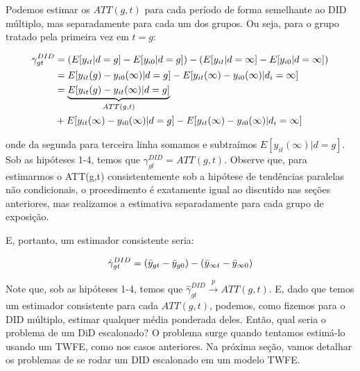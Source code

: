 \documentclass[portugues]{article}
\begin{document}
Podemos estimar os $ATT(g, t)$ para cada período de forma semelhante ao DID múltiplo, mas separadamente para cada um dos grupos. Ou seja, para o grupo tratado pela primeira vez em $t=g$:

\[
\begin{split}
    \gamma_{gt}^{DID} &= (E[y_{it} |d = g] -  E[y_{i0} |d = g]) - (E[y_{it} |d = \infty] -  E[y_{i0} |d = \infty]) \\
    &= E[y_{it}(g) - y_{i0}(\infty) | d=g]  - E[y_{it}(\infty) - y_{i0}(\infty) | d_i = \infty] \\
    &= \underbrace{E[y_{it}(g) - y_{it}(\infty) | d=g]}_{ATT(g,t)} \\
    & \hspace{5\infty} + E[y_{it}(\infty) - y_{i0}(\infty) | d=g] - E[y_{it}(\infty) - y_{i0}(\infty) | d_i = \infty] \\
\end{split}\]

\noindent onde da segunda para terceira linha somamos e subtraímos $E[y_{it}(\infty)|d=g]$. Sob as hipóteses 1-4, temos que $\gamma_{gt}^{DID} = ATT(g,t)$. Observe que, para estimarmos o ATT(g,t) consistentemente sob a hipótese de tendências paralelas não condicionais, o procedimento é exatamente igual ao discutido nas seções anteriores, mas realizamos a estimativa separadamente para cada grupo de exposição.

E, portanto, um estimador consistente seria:

$$ \hat{\gamma}^{DID}_{gt} = (\Bar{y}_{gt} - \Bar{y}_{g0}) - (\Bar{y}_{\infty t} - \Bar{y}_{\infty 0}) $$

Note que, sob as hipóteses 1-4, temos que $\hat{\gamma}^{DID}_{gt}  \xrightarrow{p} ATT(g,t)$. E, dado que temos um estimador consistente para cada $ATT(g,t)$, podemos, como fizemos para o DID múltiplo, estimar qualquer média ponderada deles. Então, qual seria o problema de um DiD escalonado? O problema surge quando tentamos estimá-lo usando um TWFE, como nos casos anteriores. Na próxima seção, vamos detalhar os problemas de se rodar um DID escalonado em um modelo TWFE.
\end{document}
